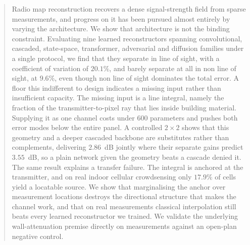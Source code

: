\begin{abstract}
Radio map reconstruction recovers a dense signal-strength field from sparse
measurements, and progress on it has been pursued almost entirely by varying the
architecture. We show that architecture is not the binding constraint. Evaluating
nine learned reconstructors spanning convolutional, cascaded, state-space,
transformer, adversarial and diffusion families under a single protocol, we find
that they separate in line of sight, with a coefficient of variation of $20.1\%$, and barely
separate at all in non line of sight, at $9.6\%$, even though non line
of sight dominates the total error. A floor this indifferent to design indicates a missing
input rather than insufficient capacity. The missing input is a line integral,
namely the fraction of the transmitter-to-pixel ray that lies inside building
material. Supplying it as one channel costs under $600$ parameters and pushes both error
modes below the entire panel. A controlled $2 \times 2$ shows that this geometry and
a deeper cascaded backbone are substitutes rather than complements, delivering
$2.86$~dB jointly where their separate gains predict $3.55$~dB, so a plain network
given the geometry beats a cascade denied it. The same result explains a transfer
failure. The integral is anchored at the transmitter, and on real indoor cellular
crowdsensing only $17.9\%$ of cells yield a locatable source. We show that
marginalising the anchor over measurement locations destroys the directional
structure that makes the channel work, and that on real measurements classical
interpolation still beats every learned reconstructor we trained. We validate the
underlying wall-attenuation premise directly on measurements against an open-plan
negative control.
\end{abstract}
